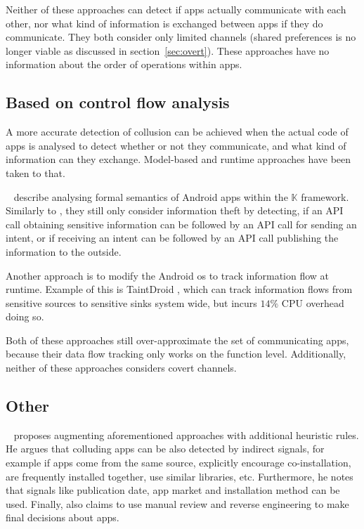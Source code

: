 \documentclass[article, oneside]{aaltoseries}
\newcommand{\sref}[1]{section~\ref{#1}}
\begin{document}
Neither of these approaches can detect if apps actually communicate with each other, nor what kind of information is exchanged between apps if they do communicate. They both consider only limited channels (shared preferences is no longer viable as discussed in \sref{sec:overt}). These approaches have no information about the order of operations within apps.

\subsection{Based on control flow analysis}

A more accurate detection of collusion can be achieved when the actual code of apps is analysed to detect whether or not they communicate, and what kind of information can they exchange. Model-based and runtime approaches have been taken to that.

\citeauthor{Asavoae2018}~\cite{Asavoae2018} describe analysing formal semantics of Android apps within the $\mathbb{K}$ framework. Similarly to \cite{Asavoae2016}, they still only consider information theft by detecting, if an API call obtaining sensitive information can be followed by an API call for sending an intent, or if receiving an intent can be followed by an API call publishing the information to the outside.

Another approach is to modify the Android \gls{os} to track information flow at runtime. Example of this is TaintDroid \cite{Enck2014}, which can track information flows from sensitive sources to sensitive sinks system wide, but incurs $14\%$ CPU overhead doing so.

Both of these approaches still over-approximate the set of communicating apps, because their data flow tracking only works on the function level. Additionally, neither of these approaches considers covert channels.

\subsection{Other}

\citeauthor{Muttik2016}~\cite{Muttik2016} proposes augmenting aforementioned approaches with additional heuristic rules. He argues that colluding apps can be also detected by indirect signals, for example if apps come from the same source, explicitly encourage co-installation, are frequently installed together, use similar libraries, etc. Furthermore, he notes that signals like publication date, app market and installation method can be used. Finally, \citeauthor{McAfee2016} also claims to use manual review and reverse engineering to make final decisions about apps.
\end{document}
